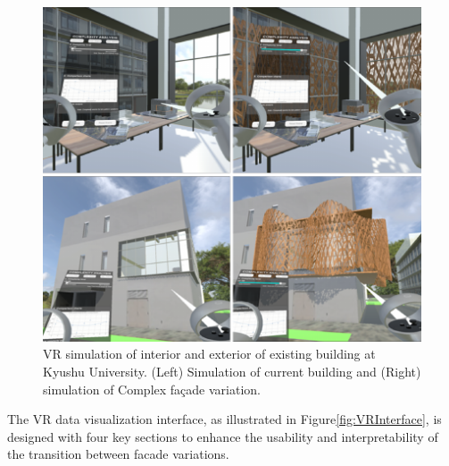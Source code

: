      \begin{figure}[htb]
          \centering
          \includegraphics[width= \linewidth]{Images/VRInteriorExterior}
          \caption{VR simulation of interior and exterior of existing building at Kyushu University. (Left) Simulation of current building and (Right) simulation of Complex façade variation.}
          \label{fig:VRInteriorExterior}
        \end{figure}


The VR data visualization interface, as illustrated in Figure\ref{fig:VRInterface}, is designed with four key sections to enhance the usability and interpretability of the transition between facade variations.

